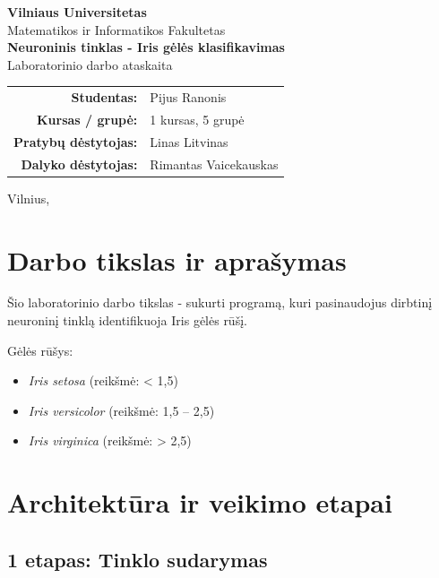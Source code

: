 \documentclass[12pt,a4paper]{article}
\begin{document}

\begin{center}
    {\large\textbf{Vilniaus Universitetas}}\\[0.2cm]
    {\large Matematikos ir Informatikos Fakultetas}\\[1.5cm]
    {\LARGE\bfseries Neuroninis tinklas - Iris gėlės klasifikavimas}\\[0.3cm]
    {\large Laboratorinio darbo ataskaita}\\[2cm]

    \begin{tabular}{rl}
        \textbf{Studentas:}          & Pijus Ranonis \\[0.2cm]
        \textbf{Kursas / grupė:}     & 1 kursas, 5 grupė \\[0.2cm]
        \textbf{Pratybų dėstytojas:} & Linas Litvinas \\
        \textbf{Dalyko dėstytojas:}  & Rimantas Vaicekauskas \\
    \end{tabular}

    \vspace{2cm}
    {\large Vilnius, \the\year}
\end{center}
\newpage


\section*{Darbo tikslas ir aprašymas}

Šio laboratorinio darbo tikslas - sukurti programą, kuri pasinaudojus dirbtinį neuroninį tinklą identifikuoja Iris gėlės rūšį.

Gėlės rūšys:
\begin{itemize}
    \item \textit{Iris setosa} (reikšmė: < 1,5)
    \item \textit{Iris versicolor} (reikšmė: 1,5 -- 2,5)
    \item \textit{Iris virginica} (reikšmė: > 2,5)
\end{itemize}

\section*{Architektūra ir veikimo etapai}

\subsection*{1 etapas: Tinklo sudarymas}
\end{document}
